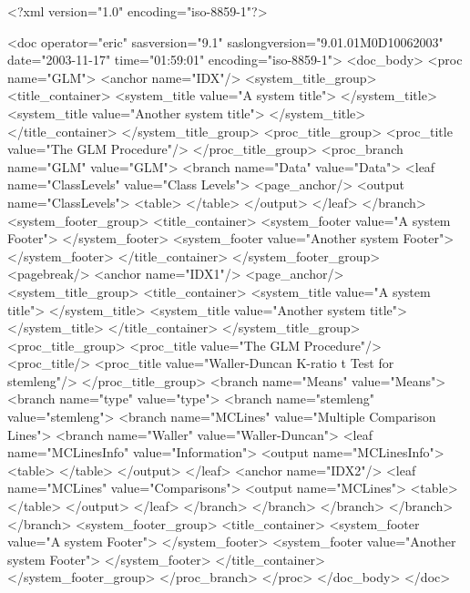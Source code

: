 \begin{sfvoutput}
<?xml version="1.0" encoding="iso-8859-1"?>

<doc operator="eric" sasversion="9.1" 
     saslongversion="9.01.01M0D10062003" 
     date="2003-11-17" time="01:59:01" encoding="iso-8859-1">
  <doc_body>
    <proc name="GLM">
      <anchor name="IDX"/>
      <system_title_group>
        <title_container>
          <system_title value="A system title">
          </system_title>
          <system_title value="Another system title">
          </system_title>
        </title_container>
      </system_title_group>
      <proc_title_group>
        <proc_title value="The GLM Procedure"/>
      </proc_title_group>
      <proc_branch name="GLM" value="GLM">
        <branch name="Data" value="Data">
          <leaf name="ClassLevels" value="Class Levels">
            <page_anchor/>
            <output name="ClassLevels">
              <table>
              </table>
            </output>
          </leaf>
        </branch>
        <system_footer_group>
          <title_container>
            <system_footer value="A system Footer">
            </system_footer>
            <system_footer value="Another system Footer">
            </system_footer>
          </title_container>
        </system_footer_group>
        <pagebreak/>
        <anchor name="IDX1"/>
        <page_anchor/>
        <system_title_group>
          <title_container>
            <system_title value="A system title">
            </system_title>
            <system_title value="Another system title">
            </system_title>
          </title_container>
        </system_title_group>
        <proc_title_group>
          <proc_title value="The GLM Procedure"/>
          <proc_title/>
          <proc_title value="Waller-Duncan K-ratio t Test for stemleng"/>
        </proc_title_group>
        <branch name="Means" value="Means">
          <branch name="type" value="type">
            <branch name="stemleng" value="stemleng">
              <branch name="MCLines" value="Multiple Comparison Lines">
                <branch name="Waller" value="Waller-Duncan">
                  <leaf name="MCLinesInfo" value="Information">
                    <output name="MCLinesInfo">
                      <table>
                      </table>
                    </output>
                  </leaf>
                  <anchor name="IDX2"/>
                  <leaf name="MCLines" value="Comparisons">
                    <output name="MCLines">
                      <table>
                      </table>
                    </output>
                  </leaf>
                </branch>
              </branch>
            </branch>
          </branch>
        </branch>
        <system_footer_group>
          <title_container>
            <system_footer value="A system Footer">
            </system_footer>
            <system_footer value="Another system Footer">
            </system_footer>
          </title_container>
        </system_footer_group>
      </proc_branch>
    </proc>
  </doc_body>
</doc>
\end{sfvoutput}

